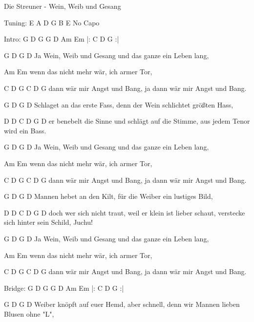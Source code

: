 Die Streuner - Wein, Weib und Gesang

Tuning: E A D G B E
No Capo


Intro: G D G  G D  Am Em  |: C D G :|


   G     D          G                            D
Ja Wein, Weib und Gesang und das ganze ein Leben lang,

     Am                      Em
wenn das nicht mehr wär, ich armer Tor,

     C       D         G             C       D         G
dann wär mir Angst und Bang, ja dann wär mir Angst und Bang.


         G      D     G                                      D
Schlaget an das erste Fass, denn der Wein schlichtet größten Hass,

     D                    D                           C       D            G       D
er benebelt die Sinne und schlägt auf die Stimme, aus jedem Tenor wird ein Bass.



   G     D          G                            D
Ja Wein, Weib und Gesang und das ganze ein Leben lang,

     Am                      Em
wenn das nicht mehr wär, ich armer Tor,

     C       D         G             C       D         G
dann wär mir Angst und Bang, ja dann wär mir Angst und Bang.


       G     D      G                                 D
Mannen hebet an den Kilt, für die Weiber ein lustiges Bild,

     D                             D                           C           D           G         D
doch wer sich nicht traut, weil er klein ist lieber schaut, verstecke sich hinter sein Schild, Juchu!



   G     D          G                            D
Ja Wein, Weib und Gesang und das ganze ein Leben lang,

     Am                      Em
wenn das nicht mehr wär, ich armer Tor,

     C       D         G             C       D         G
dann wär mir Angst und Bang, ja dann wär mir Angst und Bang.



Bridge: G D G  G D  Am Em  |: C D G :|


       G               D          G                                            D
Weiber knöpft auf euer Hemd, aber schnell, denn wir Mannen lieben Blusen ohne "L",

